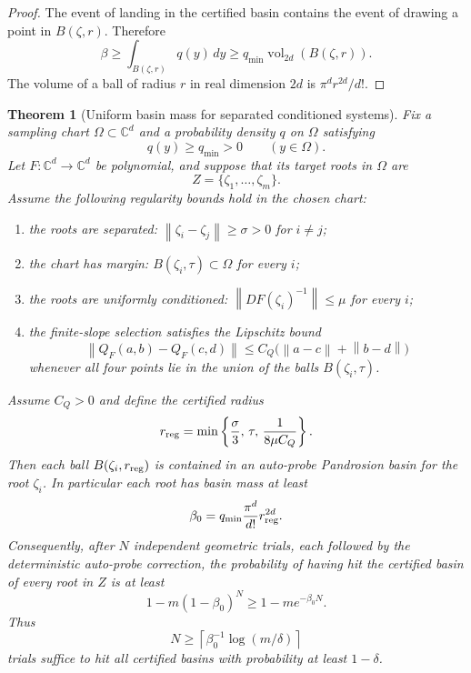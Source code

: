 \documentclass[11pt]{article}
\newtheorem{theorem}{Theorem}[section]
\theoremstyle{definition}
\theoremstyle{remark}
\newcommand{\C}{\mathbb{C}}
\newcommand{\norm}[1]{\left\lVert #1\right\rVert}
\newcommand{\zetaRoot}{\zeta}
\begin{document}
\begin{proof}
The event of landing in the certified basin contains the event of drawing a point in $B(\zetaRoot,r)$.  Therefore
\[
        \beta\geq \int_{B(\zetaRoot,r)}q(y)\,dy
        \geq q_{\min}\operatorname{vol}_{2d}(B(\zetaRoot,r)).
\]
The volume of a ball of radius $r$ in real dimension $2d$ is $\pi^d r^{2d}/d!$.

\end{proof}

\begin{theorem}[Uniform basin mass for separated conditioned systems]\label{thm:conditioned-beta}
Fix a sampling chart $\Omega\subset\C^d$ and a probability density $q$ on $\Omega$ satisfying
\[
        q(y)\geq q_{\min}>0\qquad (y\in\Omega).
\]
Let $F:\C^d\to\C^d$ be polynomial, and suppose that its target roots in $\Omega$ are
\[
        Z=\{\zeta_1,\dots,\zeta_m\}.
\]
Assume the following regularity bounds hold in the chosen chart:
\begin{enumerate}
\item the roots are separated: $\norm{\zeta_i-\zeta_j}\geq \sigma>0$ for $i\neq j$;
\item the chart has margin: $B(\zeta_i,\tau)\subset\Omega$ for every $i$;
\item the roots are uniformly conditioned: $\norm{DF(\zeta_i)^{-1}}\leq \mu$ for every $i$;
\item the finite-slope selection satisfies the Lipschitz bound
\[
        \norm{Q_F(a,b)-Q_F(c,d)}
        \leq C_Q\bigl(\norm{a-c}+\norm{b-d}\bigr)
\]
whenever all four points lie in the union of the balls $B(\zeta_i,\tau)$.
\end{enumerate}
Assume $C_Q>0$ and define the certified radius
\begin{equation}\label{eq:rreg}
        r_{\rm reg}
        =\min\left\{\frac{\sigma}{3},\,\tau,\,\frac{1}{8\mu C_Q}\right\}.
\end{equation}
Then each ball $B(\zeta_i,r_{\rm reg})$ is contained in an auto-probe Pandrosion basin for the root $\zeta_i$.  In particular each root has basin mass at least
\begin{equation}\label{eq:beta0}
        \beta_0
        =q_{\min}\frac{\pi^d}{d!}r_{\rm reg}^{2d}.
\end{equation}
Consequently, after $N$ independent geometric trials, each followed by the deterministic auto-probe correction, the probability of having hit the certified basin of every root in $Z$ is at least
\begin{equation}\label{eq:allroots-prob}
        1-m(1-\beta_0)^N
        \geq 1-m e^{-\beta_0 N}.
\end{equation}
Thus
\begin{equation}\label{eq:N-allroots}
        N\geq \left\lceil \beta_0^{-1}\log(m/\delta)\right\rceil
\end{equation}
trials suffice to hit all certified basins with probability at least $1-\delta$.
\end{theorem}
\end{document}
